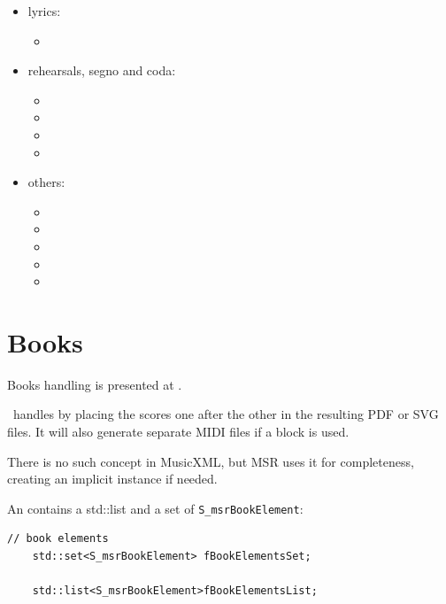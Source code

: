 \begin{itemize}
\item lyrics:

\begin{itemize}
	\item {}
  \end{itemize}

\item rehearsals, segno and coda:

\begin{itemize}
  \item {}
	\item {}
  \item {}
  \item {}
 \end{itemize}

\item others:

\begin{itemize}
  \item {}
  \item {}
  \item {}
  \item {}
  \item {}
  \end{itemize}

\end{itemize}


\section{Books}\label{Books}

Books handling is presented at .

\lily\ handles  by placing the scores one after the other in the resulting PDF or SVG files. It will also generate separate MIDI files if a  block is used.

There is no such concept in MusicXML, but MSR uses it for completeness, creating an implicit  instance if needed.

An  contains a std::list and a set of {\tt S_msrBookElement}:
\begin{lstlisting}[language=CPlusPlus]
    // book elements
    std::set<S_msrBookElement> fBookElementsSet;

    std::list<S_msrBookElement>fBookElementsList;
\end{lstlisting}

